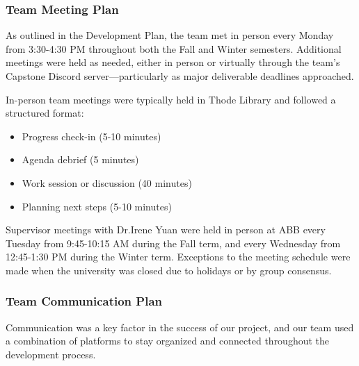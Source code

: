 \documentclass{article}
\begin{document}
\subsubsection{Team Meeting Plan}

\hspace{2em}As outlined in the Development Plan, the team met in person every Monday from 3:30-4:30 PM throughout both the Fall and Winter semesters. Additional meetings were held as needed, either in person or virtually through the team's Capstone Discord server—particularly as major deliverable deadlines approached.

In-person team meetings were typically held in Thode Library and followed a structured format:
\begin{itemize}
    \item Progress check-in (5-10 minutes)
    \item Agenda debrief (5 minutes)
    \item Work session or discussion (40 minutes)
    \item Planning next steps (5-10 minutes)
\end{itemize}

Supervisor meetings with Dr.Irene Yuan were held in person at ABB every Tuesday from 9:45-10:15 AM during the Fall term, and every Wednesday from 12:45-1:30 PM during the Winter term. Exceptions to the meeting schedule were made when the university was closed due to holidays or by group consensus.

\subsubsection{Team Communication Plan}

\hspace{2em}Communication was a key factor in the success of our project, and our team used a combination of platforms to stay organized and connected throughout the development process.
\end{document}
